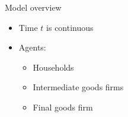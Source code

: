 \documentclass[english,usenames,dvipsnames]{beamer}
\begin{document}

\begin{frame}{Model overview}
\begin{itemize}
	\item Time $t$ is continuous 
	\item Agents:
	\begin{itemize}
		\item Households 
		\item Intermediate goods firms
		\item Final goods firm 
	\end{itemize}
\end{itemize}
\end{frame}
\end{document}
